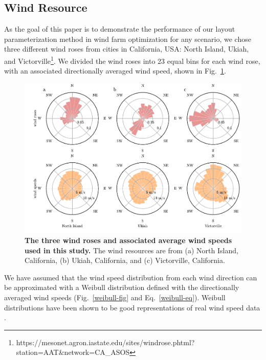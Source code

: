 \documentclass[wes, manuscript]{copernicus}
\begin{document}
\subsection{Wind Resource}
As the goal of this paper is to demonstrate the performance of our layout parameterization method in wind farm optimization for any scenario, we chose three different wind roses from cities in California, USA: North Island, Ukiah, and Victorville\footnote{https://mesonet.agron.iastate.edu/sites/windrose.phtml?station=AAT\&network=CA\_ASOS}. We divided the wind roses into 23 equal bins for each wind rose, with an associated directionally averaged wind speed, shown in Fig.~\ref{roses}.
%
\begin{figure}
\centering
\includegraphics{paper-figures/roses}
\caption{\textbf{The three wind roses and associated average wind speeds used in this study.} The wind resources are from (a) North Island, California, (b) Ukiah, California, and (c) Victorville, California.}
\label{roses}
\end{figure}
%
We have assumed that the wind speed distribution from each wind direction can be approximated with a Weibull distribution defined with the directionally averaged wind speeds (Fig.~\ref{weibull-fig} and Eq.~\ref{weibull-eq}). Weibull distributions have been shown to be good representations of real wind speed data \citep{justus1978methods,rehman1994weibull,seguro2000modern}. 
\end{document}

